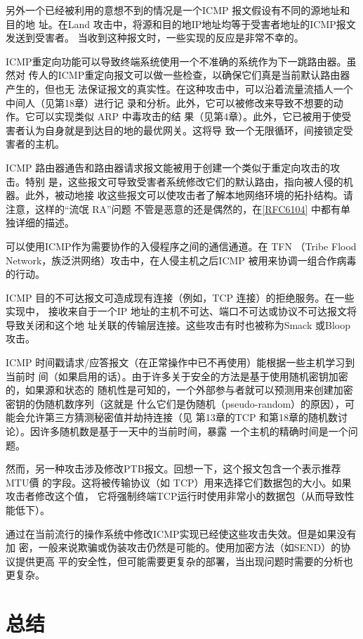 另外一个已经被利用的意想不到的情况是一个ICMP 报文假设有不同的源地址和目的地
址。在Land 攻击中，将源和目的地IP地址均等于受害者地址的ICMP报文发送到受害者。
当收到这种报文时，一些实现的反应是非常不幸的。

ICMP重定向功能可以导致终端系统使用一个不准确的系统作为下一跳路由器。虽然对
传人的ICMP重定向报文可以做一些检查，以确保它们真是当前默认路由器产生的，但也无
法保证报文的真实性。在这种攻击中，可以沿着流量流插人一个中间人（见第18章）进行记
录和分析。此外，它可以被修改来导致不想要的动作。它可以实现类似 ARP 中毒攻击的结
果（见第4章）。此外，它已被用于使受害者认为自身就是到达目的地的最优网关。这将导
致一个无限循环，间接锁定受害者的主机。

ICMP 路由器通告和路由器请求报文能被用于创建一个类似于重定向攻击的攻击。特别
是，这些报文可导致受害者系统修改它们的默认路由，指向被人侵的机器。此外，被动地接
收这些报文可以使攻击者了解本地网络环境的拓扑结构。请注意，这样的“流氓 RA”问题
不管是恶意的还是偶然的，在\href{https://www.rfc-editor.org/rfc/rfc6104}{[RFC6104]} 中都有单独详细的描述。

可以使用ICMP作为需要协作的入侵程序之间的通信通道。在 TFN （Tribe Flood
Network，族泛洪网络）攻击中，在人侵主机之后ICMP 被用来协调一组合作病毒的行动。

ICMP 目的不可达报文可造成现有连接（例如，TCP 连接）的拒绝服务。在一些实现中，
接收来自于一个IP 地址的主机不可达、端口不可达或协议不可达报文将导致关闭和这个地
址关联的传输层连接。这些攻击有时也被称为Smack 或Bloop 攻击。

ICMP 时间戳请求/应答报文（在正常操作中已不再使用）能根据一些主机学习到当前时
间（如果启用的话）。由于许多关于安全的方法是基于使用随机密钥加密的，如果源和状态的
随机性是可知的，一个外部参与者就可以预测用来创建加密密钥的伪随机数序列（这就是
什么它们是伪随机（pseudo-random）的原因），可能会允许第三方猜测秘密值并劫持连接（见
第13章的TCP 和第18章的随机数讨论）。因许多随机数是基于一天中的当前时间，暴露
一个主机的精确时间是一个问题。

然而，另一种攻击涉及修改PTB报文。回想一下，这个报文包含一个表示推荐MTU價
的字段。这将被传输协议（如 TCP）用来选择它们数据包的大小。如果攻击者修改这个值，
它将强制终端TCP运行时使用非常小的数据包（从而导致性能低下）。

通过在当前流行的操作系统中修改ICMP实现已经使这些攻击失效。但是如果没有加
密，一般来说欺骗或伪装攻击仍然是可能的。使用加密方法（如SEND）的协议提供更高
平的安全性，但可能需要更复杂的部署，当出现问题时需要的分析也更复杂。

\section{总结}

